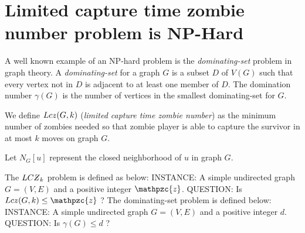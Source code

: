 \documentclass[1p]{elsarticle}
\newcommand{\NPZ}{\ooalign{$Z$\cr\hfil\rule[.8ex]{.3em}{.09ex}\hfil\cr}}
\newcommand{\zn}{\ooalign{$z$\cr\hfil\rule[.5ex]{.2em}{.08ex}\hfil\cr}}
\begin{document}
\section{Limited capture time zombie number problem is NP-Hard}\label{np-capturetime}
	A well known example of an NP-hard problem is the {\it dominating-set} problem in graph theory\cite{Hopcroft07}. A
	{\it dominating-set} for a graph $G$ is a subset $D$ of $V(G)$ such that every vertex not in $D$ is adjacent to at
	least one member of $D$. The domination number $\gamma(G)$ is the number of vertices in the smallest dominating-set
	for $G$.

	We define $Lc\zn(G,k)$ ({\it limited capture time zombie number}) as the minimum number of zombies needed so that
	zombie player is able to capture the survivor in at most $k$ moves on graph $G$. 

	Let $N_G[u]$ represent the closed neighborhood of $u$ in graph $G$.
	
	The $LC\NPZ_k$ problem is defined as below:
	{\newline}
	INSTANCE: A simple undirected graph $G = (V,E)$ and a positive integer $\mathpzc{z}$.
	{\newline}
	QUESTION: Is $Lc\zn(G,k) \leq \mathpzc{z}$ ?
	{\newline}
	{\newline}
	The dominating-set problem is defined below:
	{\newline}
	INSTANCE: A simple undirected graph $G = (V,E)$ and a positive integer $d$.
	{\newline}
	QUESTION: Is $\gamma(G) \leq d$ ?
\end{document}
